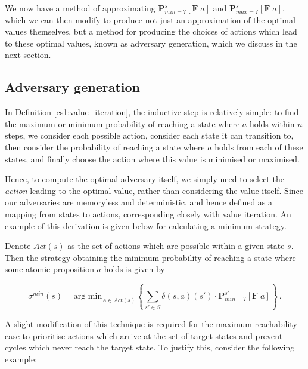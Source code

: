 We now have a method of approximating $\mathbf{P}^{s}_{min =?} [\mathbf{F} \; a]$ and $\mathbf{P}^{s}_{max =?} [\mathbf{F} \; a]$, which we can then modify to produce not just an approximation of the optimal values themselves, but a method for producing the choices of actions which lead to these optimal values, known as adversary generation, which we discuss in the next section.

\subsection{Adversary generation}
\label{cs1:adversary_gen}

In Definition \ref{cs1:value_iteration}, the inductive step is relatively simple: to find the maximum or minimum probability of reaching a state where $a$ holds within $n$ steps, we consider each possible action, consider each state it can transition to, then consider the probability of reaching a state where $a$ holds from each of these states, and finally choose the action where this value is minimised or maximised.

Hence, to compute the optimal adversary itself, we simply need to select the \emph{action} leading to the optimal value, rather than considering the value itself. Since our adversaries are memoryless and deterministic, and hence defined as a mapping from states to actions, corresponding closely with value iteration. An example of this derivation is given below for calculating a minimum strategy.

\begin{definition}
\label{cs1:min_adv_generation}

Denote $Act(s)$ as the set of actions which are possible within a given state $s$. Then the strategy obtaining the minimum probability of reaching a state where some atomic proposition $a$ holds is given by

\begin{equation*}
    \sigma^{min}(s) = \text{arg min}_{A \in Act(s)} \left\{ \sum_{s' \in S} \delta(s, a)(s') \cdot \mathbf{P}^{s'}_{min =?} [\mathbf{F} \; a]\right\} \, .
\end{equation*}

\end{definition}

A slight modification of this technique is required for the maximum reachability case to prioritise actions which arrive at the set of target states and prevent cycles which never reach the target state. To justify this, consider the following example:

